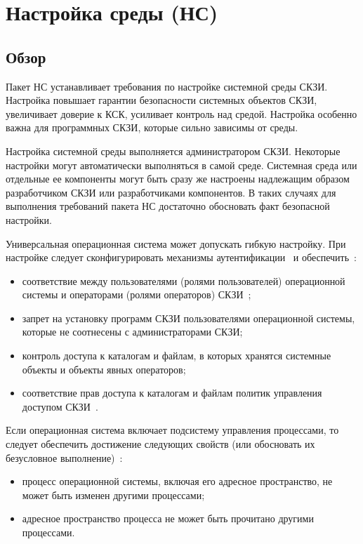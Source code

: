\section{Настройка среды (НС)}\label{ES}

\subsection{Обзор}\label{ES.Defs}

Пакет НС устанавливает требования по настройке системной среды СКЗИ.
%
Настройка повышает гарантии безопасности системных объектов СКЗИ,
увеличивает доверие к КСК, усиливает контроль над средой.
%
Настройка особенно важна для программных СКЗИ, которые сильно зависимы от 
среды.

Настройка системной среды выполняется администратором СКЗИ.
Некоторые настройки могут автоматически выполняться в самой среде. 
%
Системная среда или отдельные ее компоненты могут быть сразу же 
настроены надлежащим образом разработчиком СКЗИ или разработчиками компонентов.  
%
В таких случаях для выполнения требований пакета НС достаточно обосновать факт 
безопасной настройки.

Универсальная операционная система может допускать гибкую настройку.
При настройке следует сконфигурировать механизмы 
аутентификации~ и
обеспечить~:
\begin{itemize}
\item
соответствие между пользователями (ролями пользователей) 
операционной системы и операторами (ролями операторов) 
СКЗИ~;
\item
запрет на установку программ СКЗИ пользователями операционной системы,
которые не соотнесены с администраторами СКЗИ;
\item
контроль доступа к каталогам и файлам, в которых хранятся 
системные объекты и объекты явных операторов;
\item
соответствие прав доступа к каталогам и файлам 
политик управления доступом СКЗИ~.
\end{itemize}

Если операционная система включает подсистему управления процессами,
то следует обеспечить достижение следующих свойств 
(или обосновать их безусловное выполнение)~:
\begin{itemize}
\item
процесс операционной системы, включая его адресное пространство, не может быть 
изменен другими процессами;
\item
адресное пространство процесса не может быть прочитано другими процессами.
\end{itemize}

